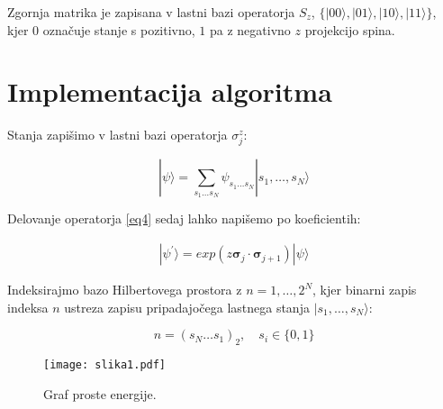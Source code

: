 \documentclass[a4paper]{article}
\newcommand{\pauli}{\mathbf{\sigma}}
\newcommand{\ket}[1]{|#1\rangle}
\begin{document}
    Zgornja matrika je zapisana v lastni bazi operatorja $S_z$, $\{ |00\rangle, |01\rangle, |10\rangle, |11\rangle \}$,
    kjer $0$ označuje stanje s pozitivno, $1$ pa z negativno $z$ projekcijo spina.

	\section{Implementacija algoritma}

    Stanja zapišimo v lastni bazi operatorja $\sigma_j^z$:

    \begin{equation}\label{eq5}
        \ket{\psi} = \sum_{s_1 \ldots s_N} \psi_{s_1 \ldots s_N} \ket{s_1, \ldots, s_N}
    \end{equation}

    Delovanje operatorja \ref{eq4} sedaj lahko napišemo po koeficientih:

    \begin{equation}\label{eq6}
        \begin{split}
            \ket{\psi^\prime} = exp(z\pauli_{j} \cdot \pauli_{j+1}) \ket{\psi}
        \end{split}
    \end{equation}

    Indeksirajmo bazo Hilbertovega prostora z $n = 1, \ldots, 2^N$, kjer binarni zapis indeksa $n$ ustreza zapisu
    pripadajočega lastnega stanja $|s_1, \ldots, s_N\rangle$:

    \begin{equation}\label{eq7}
        n = (s_N\ldots s_1)_2, \quad s_i \in \{ 0, 1 \}
    \end{equation}

    \begin{figure}
        \centering
        \texttt{[image: slika1.pdf]}
        \caption{Graf proste energije.}
        \label{slika1}
    \end{figure}
\end{document}
